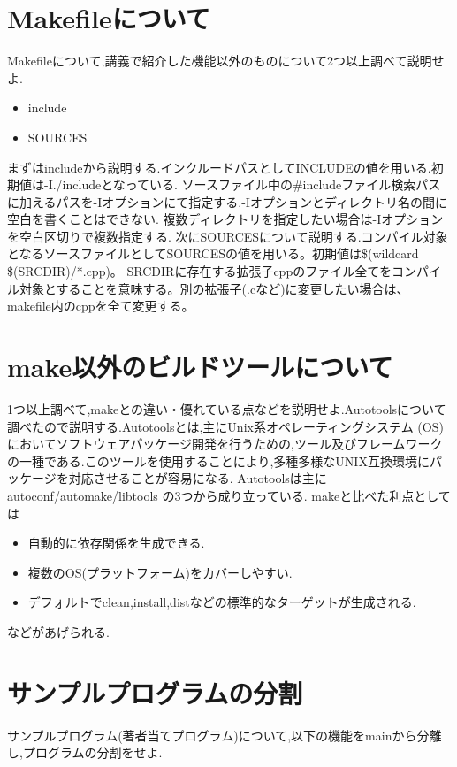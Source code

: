 \documentclass{jarticle}
\begin{document}
\section{Makefileについて}
Makefileについて,講義で紹介した機能以外のものについて2つ以上調べて説明せよ.


\begin{itemize}

\item include
\item SOURCES

\end{itemize}

まずはincludeから説明する.インクルードパスとしてINCLUDEの値を用いる.初期値は-I./includeとなっている. ソースファイル中の\#includeファイル検索パスに加えるパスを-Iオプションにて指定する.-Iオプションとディレクトリ名の間に空白を書くことはできない. 複数ディレクトリを指定したい場合は-Iオプションを空白区切りで複数指定する.
次にSOURCESについて説明する.コンパイル対象となるソースファイルとしてSOURCESの値を用いる。初期値は\$(wildcard \$(SRCDIR)/*.cpp)。 SRCDIRに存在する拡張子cppのファイル全てをコンパイル対象とすることを意味する。別の拡張子(.cなど)に変更したい場合は、makefile内のcppを全て変更する。

\section{make以外のビルドツールについて}
1つ以上調べて,makeとの違い・優れている点などを説明せよ.Autotoolsについて調べたので説明する.Autotoolsとは,主にUnix系オペレーティングシステム (OS) においてソフトウェアパッケージ開発を行うための,ツール及びフレームワークの一種である.このツールを使用することにより,多種多様なUNIX互換環境にパッケージを対応させることが容易になる. Autotoolsは主に autoconf/automake/libtools の3つから成り立っている.
makeと比べた利点としては

\begin{itemize}

\item 自動的に依存関係を生成できる.
\item 複数のOS(プラットフォーム)をカバーしやすい.
\item デフォルトでclean,install,distなどの標準的なターゲットが生成される.

\end{itemize}

などがあげられる.

\section{サンプルプログラムの分割}
\label{sec:bunkatu}
サンプルプログラム(著者当てプログラム)について,以下の機能をmainから分離し,プログラムの分割をせよ.
\end{document}
